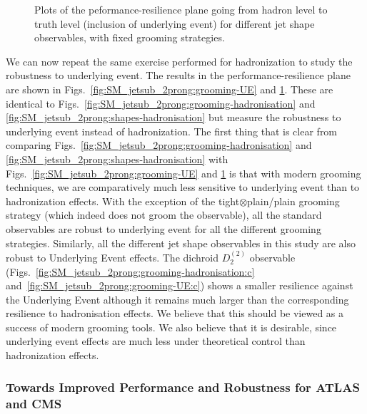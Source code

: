 \begin{figure}
  \caption{Plots of the peformance-resilience plane going from hadron level to truth level (inclusion of underlying event) for different jet shape observables, with fixed grooming strategies.}\label{fig:SM_jetsub_2prong:shapes-UE}
\end{figure}


We can now repeat the same exercise performed for hadronization to study the robustness to underlying event.
%
The results in the performance-resilience plane are shown in Figs.~\ref{fig:SM_jetsub_2prong:grooming-UE} and \ref{fig:SM_jetsub_2prong:shapes-UE}.
%
These are identical to Figs.~\ref{fig:SM_jetsub_2prong:grooming-hadronisation} and \ref{fig:SM_jetsub_2prong:shapes-hadronisation} but measure the robustness to underlying event instead of hadronization.
%
The first thing that is clear from comparing Figs.~\ref{fig:SM_jetsub_2prong:grooming-hadronisation} and \ref{fig:SM_jetsub_2prong:shapes-hadronisation} with  Figs.~\ref{fig:SM_jetsub_2prong:grooming-UE} and \ref{fig:SM_jetsub_2prong:shapes-UE} is that with modern grooming techniques, we are comparatively much less sensitive to underlying event than to hadronization effects.
%
With the exception of the tight$\otimes$plain/plain grooming strategy
(which indeed does not groom the observable), all the standard
observables are robust to underlying event for all the different
grooming strategies. Similarly, all the different jet shape
observables in this study are also robust to Underlying Event
effects. The dichroid $D_2^{(2)}$ observable
(Figs.~\ref{fig:SM_jetsub_2prong:grooming-hadronisation:c}
and~\ref{fig:SM_jetsub_2prong:grooming-UE:c}) shows a smaller resilience
against the Underlying Event although it remains much larger than the
corresponding resilience to hadronisation effects.
%
We believe that this should be viewed as a success of modern grooming tools.
%
We also believe that it is desirable, since underlying event effects are much less under theoretical control than hadronization effects. 




\subsubsection{Towards Improved Performance and Robustness for ATLAS and CMS}\label{sec:SM_jetsub_2prong:exp_compare}


